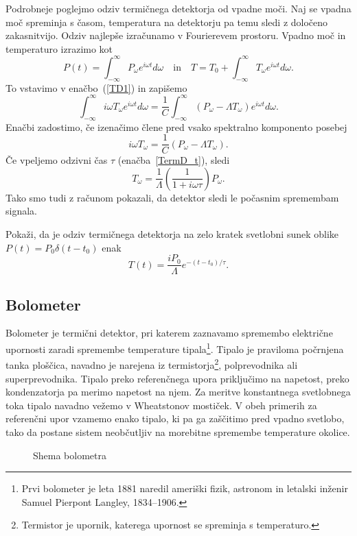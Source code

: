 Podrobneje poglejmo odziv termičnega detektorja od vpadne moči. Naj se vpadna moč
spreminja s časom, temperatura na detektorju pa temu sledi z določeno zakasnitvijo. Odziv
najlepše izračunamo v Fourierevem prostoru. Vpadno moč in temperaturo izrazimo kot
\begin{equation}
P(t) = \int_{-\infty}^{\infty} P_\omega e^{i\omega t}d\omega \quad \mathrm{in} \quad
T = T_0 + \int_{-\infty}^{\infty} T_\omega e^{i\omega t}d\omega.
\label{TermTF}
\end{equation}
To vstavimo v enačbo~(\ref{TD1}) in zapišemo
\begin{equation}
\int_{-\infty}^{\infty} i \omega T_\omega e^{i\omega t}d\omega = \frac{1}{C}
\int_{-\infty}^{\infty} (P_\omega - \Lambda T_\omega) e^{i\omega t}d\omega.
\end{equation}
Enačbi zadostimo, če izenačimo člene pred vsako spektralno komponento posebej
\begin{equation}
i \omega T_\omega = \frac{1}{C}\left(P_\omega - \Lambda T_\omega\right).
\end{equation}
Če vpeljemo odzivni čas $\tau$ (enačba~\ref{TermD_t}), sledi
\begin{equation}
T_\omega = \frac{1}{\Lambda}\left(\frac{1}{1+i \omega \tau}\right)P_\omega.
\label{TermOdziv}
\end{equation}
Tako smo tudi z računom pokazali, da detektor sledi le počasnim spremembam signala. 
\begin{definition}
Pokaži, da je odziv termičnega detektorja na zelo kratek svetlobni sunek oblike 
$P(t) = P_0 \delta(t-t_0)$ enak 
\begin{equation}
T(t)=\frac{iP_0}{\Lambda}e^{-(t-t_0)/\tau}.
\end{equation}
\end{definition}

\subsection*{Bolometer}
Bolometer je termični detektor, pri katerem zaznavamo spremembo 
električne upornosti
zaradi spremembe temperature tipala\footnote{Prvi bolometer je leta 1881 naredil
ameriški fizik, astronom in letalski inženir Samuel Pierpont Langley, 1834--1906.}. 
Tipalo je praviloma počrnjena tanka ploščica, 
navadno je narejena iz termistorja\footnote{Termistor je upornik, katerega
upornost se spreminja s temperaturo.}, 
polprevodnika ali superprevodnika. Tipalo preko
referenčnega upora priključimo na napetost, preko kondenzatorja pa merimo napetost na njem.
Za meritve konstantnega svetlobnega toka tipalo navadno vežemo v Wheatstonov mostiček. V obeh
primerih za referenčni upor vzamemo enako tipalo, ki pa ga zaščitimo pred vpadno svetlobo, 
tako da postane sistem neobčutljiv na morebitne spremembe temperature okolice.
\begin{figure}[h!]
\centering
\def\svgwidth{75truemm} 

\caption{Shema bolometra}
\label{fig:Bolometer-shema}
\end{figure}

